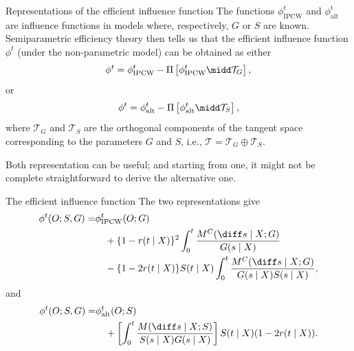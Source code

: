 \documentclass[smaller]{beamer}\usepackage{listings}
\begin{document}
\begin{frame}[label={sec:org0a19aa8}]{Representations of the efficient influence function}
The functions $\phi^t_{\mathrm{IPCW}}$ and $\phi^t_{\mathrm{alt}}$ are influence functions in
models where, respectively, $G$ or $S$ are known. \pause Semiparametric efficiency theory then
tells us that the efficient influence function $\phi^t$ (under the non-parametric model) can be
obtained as either
\begin{equation*}
  \phi^t = 
  \phi^t_{\mathrm{IPCW}} - \Pi
  \left[
    \phi^t_{\mathrm{IPCW}} \midd \mathcal{T}_{G}
  \right],
\end{equation*}
or
\begin{equation*}
  \phi^t = 
  \phi^t_{\mathrm{alt}} - \Pi
  \left[
    \phi^t_{\mathrm{alt}} \midd \mathcal{T}_{S}
  \right],
\end{equation*}
where $\mathcal{T}_G$ and $\mathcal{T}_S$ are the orthogonal components of the tangent space
corresponding to the parameters $G$ and $S$, i.e., $\mathcal{T} = \mathcal{T}_G \oplus \mathcal{T}_S$.

\vfill \pause

Both representation can be useful; and starting from one, it might not be complete
straightforward to derive the alternative one.
\end{frame}

\begin{frame}[label={sec:org83ed5df}]{The efficient influence function}
The two representations give
\begin{align*}
  \phi^t(O; S, G) =   & \phi^t_{\mathrm{IPCW}}(O; G)
  \\ & \quad +
       \{1-r(t \mid X)\}^2 \int_0^t \frac{M^C(\diff s \mid X; G)}{G(s \mid X)}
  \\ & \quad -
       \{1-2r(t \mid X)\} S(t \mid X) \int_0^t \frac{M^C(\diff s \mid X; G)}{G(s \mid X) S(s
       \mid X)},
\end{align*}
and
\begin{align*}
  \phi^t(O; S, G) = & \phi^t_{\mathrm{alt}}(O; S)
  \\ & \quad + \left[ %
    \int_0^t \frac{M(\diff s \mid X; S)}{S(s\mid X)G(s \mid X)} \right] S(t \mid X)
  (1 - 2r(t\mid X)).
\end{align*}
\end{frame}
\end{document}
